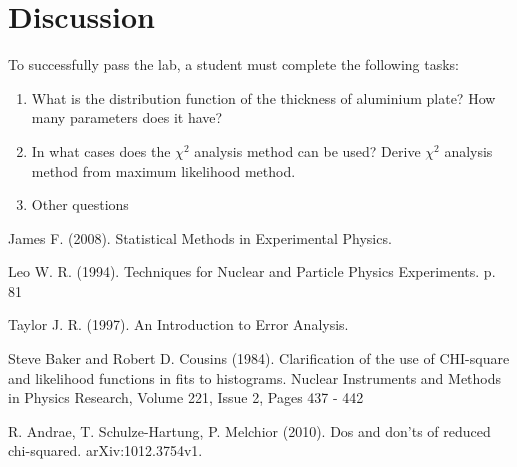 \documentclass[12pt,a4paper]{report}
\begin{document}
\section{Discussion}
To successfully pass the lab, a student must complete the following tasks:
\begin{enumerate}
\item What is the distribution function of the thickness of aluminium plate? How many parameters does it have? 
\item In what cases does the $\chi^2$ analysis method can be used? Derive $\chi^2$ analysis method from maximum likelihood method.
\item Other questions
\end{enumerate}

\medskip

\begin{thebibliography}{99}

James F. (2008). Statistical Methods in Experimental Physics.

Leo W. R. (1994). Techniques for Nuclear and Particle Physics Experiments. p. 81

Taylor J. R. (1997). An Introduction to Error Analysis. 

Steve Baker and Robert D. Cousins (1984). Clarification of the use of CHI-square and likelihood functions in fits to histograms. Nuclear Instruments and Methods in Physics Research, Volume 221, Issue 2, Pages 437 - 442 

R. Andrae, T. Schulze-Hartung, P. Melchior (2010). Dos and don’ts of reduced chi-squared. arXiv:1012.3754v1. 

\end{thebibliography}
\end{document}

